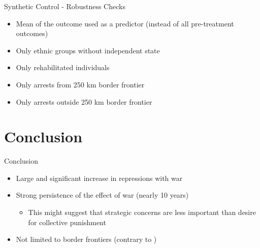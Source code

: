 \documentclass[11pt]{beamer}
\begin{document}
\begin{frame}[label=sc_robustness_checks]{Synthetic Control - Robustness Checks}
 \begin{itemize}
    \item Mean of the outcome used as a predictor (instead of all pre-treatment outcomes) \hyperlink{sc_mean}{}
        \item Only ethnic groups without independent state \hyperlink{sc_without_ind_state}{}
        \item Only rehabilitated individuals \hyperlink{sc_rehabs}{}
        \item Only arrests from 250 km border frontier \hyperlink{sc_border_area}{}
        \item Only arrests outside 250 km border frontier \hyperlink{sc_non_border_area}{}
    \end{itemize}
\end{frame}


\section{Conclusion}

\begin{frame}{Conclusion}
\begin{itemize}
    \item Large and significant increase in repressions with war
    \item Strong persistence of the effect of war (nearly 10 years)
    \begin{itemize}
        \item This might suggest that strategic concerns are less important than desire for collective punishment 
    \end{itemize}
    \item Not limited to border frontiers (contrary to \citet{mcnamee_demographic_2019})
\end{itemize}

\end{frame}
\end{document}
